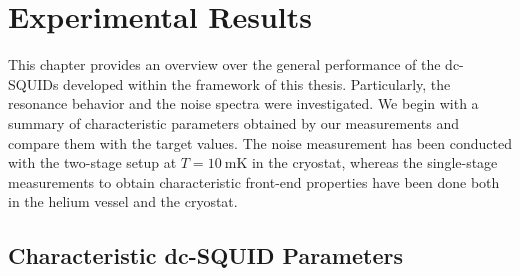 \chapter{Experimental Results} \label{ch_results}

This chapter provides an overview over the general performance of the dc-SQUIDs developed within the framework of this thesis. Particularly, the resonance behavior and the noise spectra were investigated. We begin with a summary of characteristic parameters obtained by our measurements and compare them with the target values. 
The noise measurement has been conducted with the two-stage setup at $T=\qty{10}{\milli\kelvin}$ in the cryostat, whereas the single-stage measurements to obtain characteristic front-end properties have been done both in the helium vessel and the cryostat. 

\section{Characteristic dc-SQUID Parameters} \label{sec_charac}

